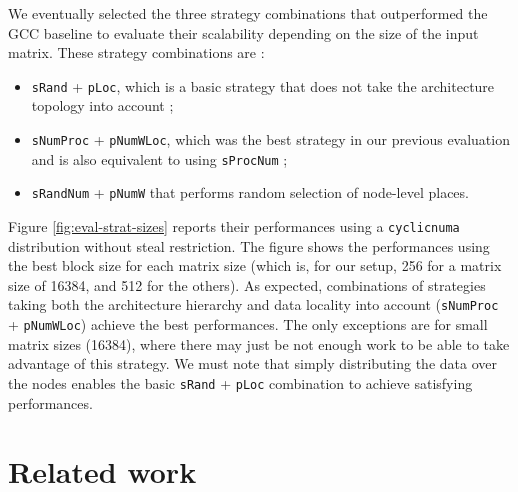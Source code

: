 \documentclass{Styles/llncs}
\begin{document}
We eventually selected the three strategy combinations that outperformed the GCC baseline to evaluate their scalability depending on the size of the input matrix.
These strategy combinations are :
\begin{itemize}
  \item \verb/sRand/ + \verb/pLoc/, which is a basic strategy that does not take the architecture topology into account ;
  \item \verb/sNumProc/ + \verb/pNumWLoc/, which was the best strategy in our previous
    evaluation and is also equivalent to using \verb/sProcNum/ ;
  \item \verb/sRandNum/ + \verb/pNumW/ that performs random selection of node-level places.
\end{itemize}

Figure \ref{fig:eval-strat-sizes} reports their performances using a \verb/cyclicnuma/ distribution without steal restriction.
The figure shows the performances using the best block size for each matrix size (which is, for our setup, 256 for a matrix
size of 16384, and 512 for the others).
As expected, combinations of strategies taking both the architecture hierarchy and data locality into account (\verb/sNumProc/
+ \verb/pNumWLoc/) achieve the best performances.
The only exceptions are for small matrix sizes (16384), where there may just be
not enough work to be able to take advantage of this strategy.
We must note that simply distributing the data over the nodes enables the basic
\verb/sRand/ + \verb/pLoc/ combination to achieve satisfying performances.

\section{Related work}
\label{sec:related-work}
\end{document}
